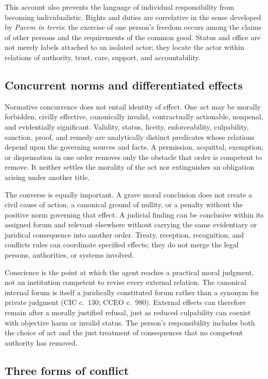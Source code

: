 This account also prevents the language of individual responsibility from becoming individualistic. Rights and duties are correlative in the sense developed by \emph{Pacem in terris}: the exercise of one person's freedom occurs among the claims of other persons and the requirements of the common good. Status and office are not merely labels attached to an isolated actor; they locate the actor within relations of authority, trust, care, support, and accountability.

\subsection{Concurrent norms and differentiated effects}

Normative concurrence does not entail identity of effect. One act may be morally forbidden, civilly effective, canonically invalid, contractually actionable, nonpenal, and evidentially significant. Validity, status, liceity, enforceability, culpability, sanction, proof, and remedy are analytically distinct predicates whose relations depend upon the governing sources and facts. A permission, acquittal, exemption, or dispensation in one order removes only the obstacle that order is competent to remove. It neither settles the morality of the act nor extinguishes an obligation arising under another title.

The converse is equally important. A grave moral conclusion does not create a civil cause of action, a canonical ground of nullity, or a penalty without the positive norm governing that effect. A judicial finding can be conclusive within its assigned forum and relevant elsewhere without carrying the same evidentiary or juridical consequence into another order. Treaty, reception, recognition, and conflicts rules can coordinate specified effects; they do not merge the legal persons, authorities, or systems involved.

Conscience is the point at which the agent reaches a practical moral judgment, not an institution competent to revise every external relation. The canonical internal forum is itself a juridically constituted forum rather than a synonym for private judgment (CIC c.~130; CCEO c.~980). External effects can therefore remain after a morally justified refusal, just as reduced culpability can coexist with objective harm or invalid status. The person's responsibility includes both the choice of act and the just treatment of consequences that no competent authority has removed.

\subsection{Three forms of conflict}


